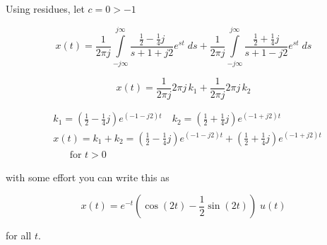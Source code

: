 \documentclass{article}
\begin{document}
Using residues, let $c = 0 > -1$

$$
x(t) = \frac{1}{2 \pi j} \int\limits_{-j \infty}^{j\infty} \frac{\frac{1}{2}-\frac{1}{4} j}{s+1+j2} e^{st}\; ds + \frac{1}{2 \pi j} \int\limits_{-j \infty}^{j\infty} \frac{\frac{1}{2}+\frac{1}{4} j}{s+1-j2} e^{st}\; ds 
$$

\[
x(t)=\frac{1}{2 \pi j} 2 \pi j \, k_{1}+\frac{1}{2 \pi j} 2 \pi j\, k_{2}
\]

$$
\begin{aligned}
& k_{1}=\left(\frac{1}{2}-\frac{1}{4} j\right) e^{(-1-j 2) t} \quad k_{2}=\left(\frac{1}{2}+\frac{1}{4} j\right) e^{(-1+j 2) t} \\
& x(t)=k_{1}+k_{2}=\left(\frac{1}{2}-\frac{1}{4} j\right) e^{(-1-j 2) t}+\left(\frac{1}{2}+\frac{1}{4} j\right) e^{(-1+j 2) t} \\
& \text { } \quad \text{for } t > 0 
\end{aligned}
$$

with some effort you can write this as

$$
x(t)=e^{-t}\left(\cos (2 t)-\frac{1}{2} \sin (2 t)\right)\; u(t)
$$

for all $t$.
\end{document}
